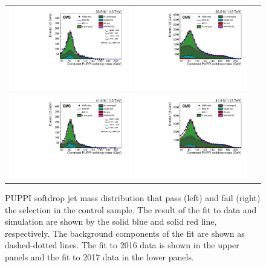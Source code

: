  \begin{figure}[htbp]
 \centering
 \begin{tabular}{cc}
 \includegraphics[width=0.49\textwidth]{figures/analysis/search3/AN-17-303/vtag/newddt_2016_pass.pdf}
 \includegraphics[width=0.49\textwidth]{figures/analysis/search3/AN-17-303/vtag/newddt_2016_fail.pdf}\\
 \includegraphics[width=0.49\textwidth]{figures/analysis/search3/AN-17-303/vtag/newddt_TopPtRew_2017_pass.pdf}
 \includegraphics[width=0.49\textwidth]{figures/analysis/search3/AN-17-303/vtag/newddt_TopPtRew_2017_fail.pdf}
 \end{tabular}
 \caption{PUPPI softdrop jet mass distribution that pass (left) and fail (right) the  selection in the \ttbar control sample. The result of the fit to data and simulation are shown by the solid blue and solid red line, respectively. The background components of the fit are shown as dashed-dotted lines. The fit to 2016 data is shown in the upper panels and the fit to 2017 data in the lower panels.}
 \label{fig:simFit}
 \end{figure}
